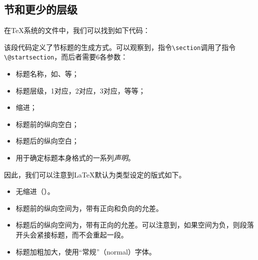 \subsection{节和更少的层级}

在\TeX 系统的文件中，我们可以找到如下代码：


该段代码定义了节标题的生成方式。可以观察到，指令\verb|\section|调用了指令\verb|\@startsection|，而后者需要6各参数：

\begin{itemize}
    \item 标题名称，如、等；
    \item 标题层级，1对应，2对应，3对应，等等；
    \item 缩进；
    \item 标题前的纵向空白；
    \item 标题后的纵向空白；
    \item 用于确定标题本身格式的一系列\emph{声明}。
\end{itemize}

因此，我们可以注意到\LaTeX 默认为类型设定的版式如下。

\begin{itemize}
    \item 无缩进（\dm{0pt}）。
    \item 标题前的纵向空间为\dm{3.5ex}，带有正向\dm{-1ex}和负向\dm{-.2ex}的允差。
    \item 标题后的纵向空间为\dm{2.3ex}，带有正向\dm{.2ex}的允差。可以注意到，如果空间为负，则段落开头会紧接标题，而不会重起一段。
    \item 标题加粗加大，使用``常规''（normal）字体。
\end{itemize}

